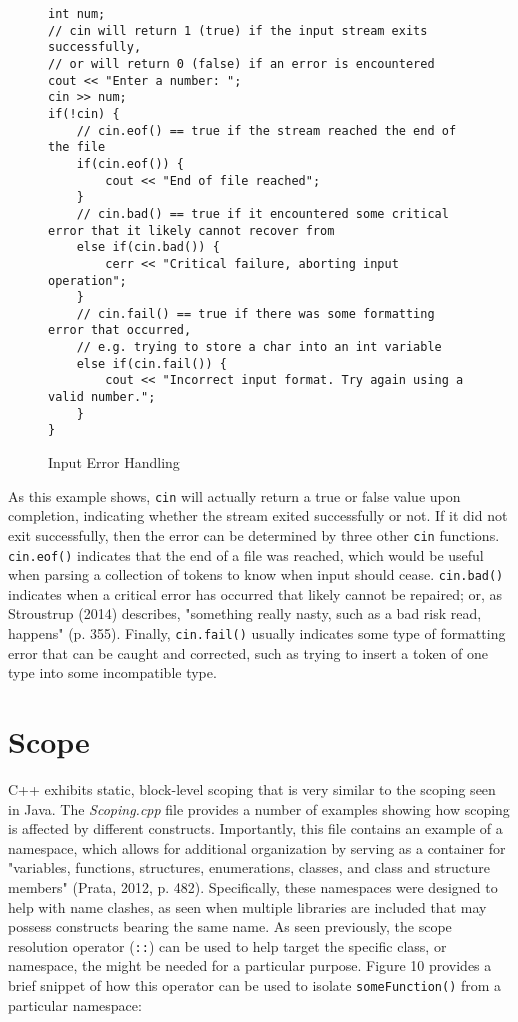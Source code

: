 \documentclass[11pt]{article}
\begin{document}
\begin{figure}[!h]
\centering
\begin{BVerbatim}
int num;
// cin will return 1 (true) if the input stream exits successfully,
// or will return 0 (false) if an error is encountered
cout << "Enter a number: ";
cin >> num;
if(!cin) {
	// cin.eof() == true if the stream reached the end of the file
	if(cin.eof()) {
		cout << "End of file reached";
	}
	// cin.bad() == true if it encountered some critical error that it likely cannot recover from
	else if(cin.bad()) {
		cerr << "Critical failure, aborting input operation";
	}
	// cin.fail() == true if there was some formatting error that occurred,
	// e.g. trying to store a char into an int variable
	else if(cin.fail()) {
		cout << "Incorrect input format. Try again using a valid number.";
	}
}
\end{BVerbatim}
\caption{Input Error Handling}
\end{figure} \FloatBarrier

\noindent
As this example shows, \texttt{cin} will actually return a true or false value upon completion, indicating whether the stream exited successfully or not.  If it did not exit successfully, then the error can be determined by three other \texttt{cin} functions.  \texttt{cin.eof()} indicates that the end of a file was reached, which would be useful when parsing a collection of tokens to know when input should cease.  \texttt{cin.bad()} indicates when a critical error has occurred that likely cannot be repaired; or, as Stroustrup (2014) describes, "something really nasty, such as a bad risk read, happens" (p. 355).  Finally, \texttt{cin.fail()} usually indicates some type of formatting error that can be caught and corrected, such as trying to insert a token of one type into some incompatible type.

\section{Scope}
C++ exhibits static, block-level scoping that is very similar to the scoping seen in Java.  The \textit{Scoping.cpp} file provides a number of examples showing how scoping is affected by different constructs.  Importantly, this file contains an example of a namespace, which allows for additional organization by serving as a container for "variables, functions, structures, enumerations, classes, and class and structure members" (Prata, 2012, p. 482).  Specifically, these namespaces were designed to help with name clashes, as seen when multiple libraries are included that may possess constructs bearing the same name.  As seen previously, the scope resolution operator (\texttt{::}) can be used to help target the specific class, or namespace, the might be needed for a particular purpose.  Figure 10 provides a brief snippet of how this operator can be used to isolate \texttt{someFunction()} from a particular namespace:
	
\end{document}

